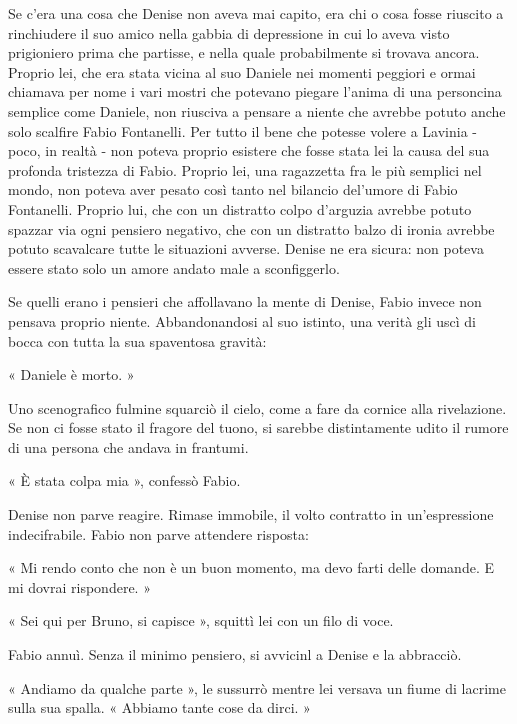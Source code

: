 Se c'era una cosa che Denise non aveva mai capito, era chi o cosa fosse riuscito a rinchiudere il suo amico nella gabbia di depressione in cui lo aveva visto prigioniero prima che partisse, e nella quale probabilmente si trovava ancora. Proprio lei, che era stata vicina al suo Daniele nei momenti peggiori e ormai chiamava per nome i vari mostri che potevano piegare l'anima di una personcina semplice come Daniele, non riusciva a pensare a niente che avrebbe potuto anche solo scalfire Fabio Fontanelli. Per tutto il bene che potesse volere a Lavinia - poco, in realtà - non poteva proprio esistere che fosse stata lei la causa del sua profonda tristezza di Fabio. Proprio lei, una ragazzetta fra le più semplici nel mondo, non poteva aver pesato così tanto nel bilancio del'umore di Fabio Fontanelli. Proprio lui, che con un distratto colpo d'arguzia avrebbe potuto spazzar via ogni pensiero negativo, che con un distratto balzo di ironia avrebbe potuto scavalcare tutte le situazioni avverse. Denise ne era sicura: non poteva essere stato solo un amore andato male a sconfiggerlo.

Se quelli erano i pensieri che affollavano la mente di Denise, Fabio invece non pensava proprio niente. Abbandonandosi al suo istinto, una verità gli uscì di bocca con tutta la sua spaventosa gravità:

« Daniele è morto. »

Uno scenografico fulmine squarciò il cielo, come a fare da cornice alla rivelazione. Se non ci fosse stato il fragore del tuono, si sarebbe distintamente udito il rumore di una persona che andava in frantumi.

« È stata colpa mia », confessò Fabio.

Denise non parve reagire. Rimase immobile, il volto contratto in un'espressione indecifrabile. Fabio non parve attendere risposta:

« Mi rendo conto che non è un buon momento, ma devo farti delle domande. E mi dovrai rispondere. »

« Sei qui per Bruno, si capisce », squittì lei con un filo di voce.

Fabio annuì. Senza il minimo pensiero, si avvicinl a Denise e la abbracciò.

« Andiamo da qualche parte », le sussurrò mentre lei versava un fiume di lacrime sulla sua spalla. « Abbiamo tante cose da dirci. »

